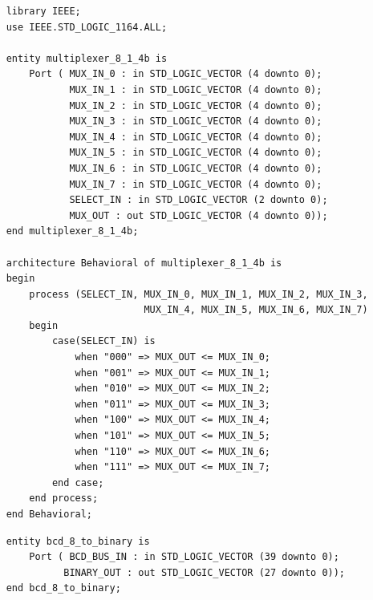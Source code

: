 \documentclass[11pt]{article}
\newenvironment{code}{\captionsetup{type=listing}}{}
\begin{document}
\begin{code}
	\begin{verbatim}
    library IEEE;
    use IEEE.STD_LOGIC_1164.ALL;
    
    entity multiplexer_8_1_4b is
        Port ( MUX_IN_0 : in STD_LOGIC_VECTOR (4 downto 0);
               MUX_IN_1 : in STD_LOGIC_VECTOR (4 downto 0);
               MUX_IN_2 : in STD_LOGIC_VECTOR (4 downto 0);
               MUX_IN_3 : in STD_LOGIC_VECTOR (4 downto 0);
               MUX_IN_4 : in STD_LOGIC_VECTOR (4 downto 0);
               MUX_IN_5 : in STD_LOGIC_VECTOR (4 downto 0);
               MUX_IN_6 : in STD_LOGIC_VECTOR (4 downto 0);
               MUX_IN_7 : in STD_LOGIC_VECTOR (4 downto 0);
               SELECT_IN : in STD_LOGIC_VECTOR (2 downto 0);
               MUX_OUT : out STD_LOGIC_VECTOR (4 downto 0));
    end multiplexer_8_1_4b;
    
    architecture Behavioral of multiplexer_8_1_4b is
    begin
        process (SELECT_IN, MUX_IN_0, MUX_IN_1, MUX_IN_2, MUX_IN_3,
                            MUX_IN_4, MUX_IN_5, MUX_IN_6, MUX_IN_7)
        begin
            case(SELECT_IN) is
                when "000" => MUX_OUT <= MUX_IN_0;
                when "001" => MUX_OUT <= MUX_IN_1;
                when "010" => MUX_OUT <= MUX_IN_2;
                when "011" => MUX_OUT <= MUX_IN_3;
                when "100" => MUX_OUT <= MUX_IN_4;
                when "101" => MUX_OUT <= MUX_IN_5;
                when "110" => MUX_OUT <= MUX_IN_6;
                when "111" => MUX_OUT <= MUX_IN_7;
            end case;
        end process;
    end Behavioral;
  \end{verbatim}
	\captionsetup{belowskip=0pt}
	\label{code:8x5_to_5_multiplexer}
\end{code}

\vspace*{1cm}

\begin{code}
	\begin{verbatim}
    entity bcd_8_to_binary is
        Port ( BCD_BUS_IN : in STD_LOGIC_VECTOR (39 downto 0);
              BINARY_OUT : out STD_LOGIC_VECTOR (27 downto 0));
    end bcd_8_to_binary;
  \end{verbatim}
	\captionsetup{belowskip=0pt}
	\label{code:bcd_to_binary}
\end{code}

\vspace*{1cm}
\end{document}
